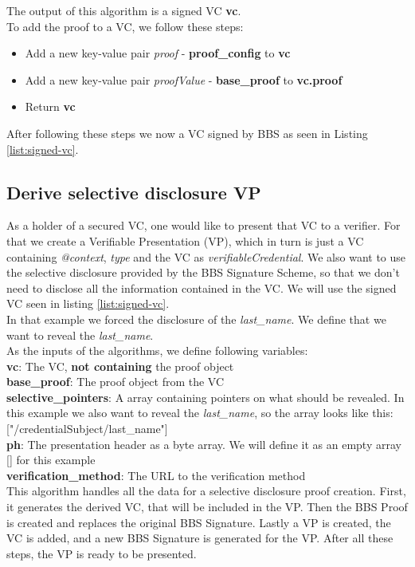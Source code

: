 \documentclass[
	a4paper               %
	,BCOR=0mm            %
	,bibliography=totoc   %
	,listof=totoc         %
	,monolingual
	,twoside=false
]{bfhthesis}              %
\begin{document}
The output of this algorithm is a signed VC \textbf{vc}.\\

To add the proof to a VC, we follow these steps:
\begin{itemize}
	\item Add a new key-value pair \textit{proof} - \textbf{proof\_config} to \textbf{vc}
	\item Add a new key-value pair \textit{proofValue} - \textbf{base\_proof} to \textbf{vc.proof}
	\item Return \textbf{vc}
\end{itemize}

After following these steps we now a VC signed by BBS as seen in Listing \ref{list:signed-vc}.

\subsection{Derive selective disclosure VP}
As a holder of a secured VC, one would like to present that VC to a verifier.
For that we create a Verifiable Presentation (VP), which in turn is just a VC containing \textit{@context}, \textit{type} and the VC as \textit{verifiableCredential}.
We also want to use the selective disclosure provided by the BBS Signature Scheme, so that we don't need to disclose all the information contained in the VC.
We will use the signed VC seen in listing \ref{list:signed-vc}.\\
In that example we forced the disclosure of the \textit{last\_name}.
We define that we want to reveal the \textit{last\_name}.\\

As the inputs of the algorithms, we define following variables:\\
\textbf{vc}: The VC, \textbf{not containing} the proof object\\
\textbf{base\_proof}: The proof object from the VC\\
\textbf{selective\_pointers}: A array containing pointers on what should be revealed. In this example we also want to reveal the \textit{last\_name}, so the array looks like this: ["/credentialSubject/last\_name"]\\
\textbf{ph}: The presentation header as a byte array. We will define it as an empty array [] for this example\\
\textbf{verification\_method}: The URL to the verification method\\

This algorithm handles all the data for a selective disclosure proof creation.
First, it generates the derived VC, that will be included in the VP.
Then the BBS Proof is created and replaces the original BBS Signature.
Lastly a VP is created, the VC is added, and a new BBS Signature is generated for the VP.
After all these steps, the VP is ready to be presented.\\
\end{document}
